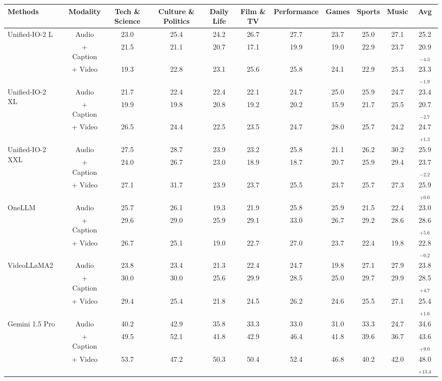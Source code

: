 \begin{tabular}{lcccccccccc}
\toprule

Methods & Modality & Tech \& Science  & Culture \& Politics & Daily Life & Film \& TV & Performance & Games & Sports & Music & Avg \\


\midrule
\multirow{3}{*}{Unified-IO-2 L~\cite{lu2024unified}} & Audio & 23.0 & 25.4 & 24.2 & 26.7 & 27.7 & 23.7 & 25.0 & 27.1 & 25.2 \\
 & + Caption & 21.5 & 21.1 & 20.7 & 17.1 & 19.9 & 19.0 & 22.9 & 23.7 & 20.9{$_{-4.3}$} \\
 & + Video & 19.3 & 22.8 & 23.1 & 25.6 & 25.8 & 24.1 & 22.9 & 25.3 & 23.3{$_{-1.9}$} \\
\midrule
\multirow{3}{*}{Unified-IO-2 XL~\cite{lu2024unified}} & Audio & 21.7 & 22.4 & 22.4 & 22.1 & 24.7 & 25.0 & 25.9 & 24.7 & 23.4 \\
 & + Caption & 19.9 & 19.8 & 20.8 & 19.2 & 20.2 & 15.9 & 21.7 & 25.5 & 20.7{$_{-2.7}$} \\
 & + Video & 26.5 & 24.4 & 22.5 & 23.5 & 24.7 & 28.0 & 25.7 & 24.2 & 24.7{$_{+1.3}$} \\
\midrule
\multirow{3}{*}{Unified-IO-2 XXL~\cite{lu2024unified}} & Audio & 27.5 & 28.7 & 23.9 & 23.2 & 25.8 & 21.1 & 26.2 & 30.2 & 25.9 \\
 & + Caption & 24.0 & 26.7 & 23.0 & 18.9 & 18.7 & 20.7 & 25.9 & 29.4 & 23.7{$_{-2.2}$} \\
 & + Video & 27.1 & 31.7 & 23.9 & 23.7 & 25.5 & 23.7 & 25.7 & 27.3 & 25.9{$_{+0.0}$} \\
\midrule
\multirow{3}{*}{OneLLM~\cite{han2024onellm}} & Audio & 25.7 & 26.1 & 19.3 & 21.9 & 25.8 & 25.9 & 21.5 & 22.4 & 23.0 \\
 & + Caption & 29.6 & 29.0 & 25.9 & 29.1 & 33.0 & 26.7 & 29.2 & 28.6 & 28.6{$_{+5.6}$} \\
 & + Video & 26.7 & 25.1 & 19.0 & 22.7 & 27.0 & 23.7 & 22.4 & 19.8 & 22.8{$_{-0.2}$} \\
\midrule
\multirow{3}{*}{VideoLLaMA2~\cite{cheng2024videollama}} & Audio & 23.8 & 23.4 & 21.3 & 22.4 & 24.7 & 19.8 & 27.1 & 27.9 & 23.8 \\
 & + Caption & 30.0 & 30.0 & 25.6 & 29.9 & 28.5 & 25.0 & 29.7 & 29.9 & 28.5{$_{+4.7}$} \\
 & + Video & 29.4 & 25.4 & 21.8 & 24.5 & 26.2 & 24.6 & 25.5 & 27.1 & 25.4{$_{+1.6}$} \\
\midrule
\multirow{3}{*}{Gemini 1.5 Pro~\cite{team2024gemini}} & Audio & 40.2 & 42.9 & 35.8 & 33.3 & 33.0 & 31.0 & 33.3 & 24.7 & 34.6 \\
 & + Caption & 49.5 & 52.1 & 41.8 & 42.9 & 46.4 & 41.8 & 39.6 & 36.7 & 43.6{$_{+9.0}$} \\
 & + Video & 53.7 & 47.2 & 50.3 & 50.4 & 52.4 & 46.8 & 40.2 & 42.0 & 48.0{$_{+13.4}$} \\


\bottomrule
 \end{tabular}